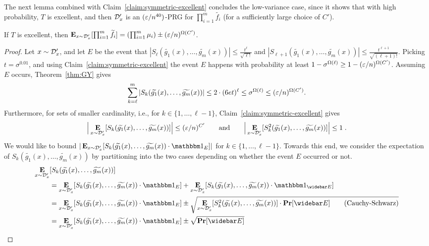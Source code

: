 The next lemma combined with Claim~\ref{claim:symmetric-excellent} concludes the low-variance case, since it shows that with high probability, $T$ is excellent, and then ${\mathcal{D}'_x}$ is an $(\varepsilon/n^{40})$-PRG for $\prod_{i=1}^{m}{\tilde{f_i}}$ (for a sufficiently large choice of $C'$).

\begin{lemma}
If $T$ is excellent, then $\mathop{\bf E\/}_{x\sim {\mathcal{D}'_x}}[	\prod_{i=1}^{m}{\widetilde{f_i}}] = (\prod_{i=1}^{m}\mu_i) \pm (\varepsilon/n)^{\Omega(C')}$.
\end{lemma}
\begin{proof}
Let $x\sim {\mathcal{D}'_x}$, 
and let $E$ be the event that
$|S_{\ell}(\tilde{g_1}(x), \ldots, \tilde{g_m}(x))| \le \frac{t^\ell}{\sqrt{\ell!}}$ 
and 
$|S_{\ell+1}(\tilde{g_1}(x), \ldots, \tilde{g_m}(x))| \le \frac{t^{\ell+1}}{\sqrt{(\ell+1)!}}$.
Picking $t = \sigma^{0.01}$, and using Claim~\ref{claim:symmetric-excellent} the event $E$ happens with probability at least $1-\sigma^{\Omega(\ell)} \ge 1-(\varepsilon/n)^{\Omega(C')}$.
Assuming $E$ occurs, 
 Theorem~\ref{thm:GY} gives
$$\sum_{k=\ell}^{m} |S_{k}(\widetilde{g_1}(x), \ldots, \widetilde{g_m}(x))| \le 2\cdot (6et)^{\ell} \le \sigma^{\Omega(\ell)} \le (\varepsilon/n)^{\Omega(C')}.$$
Furthermore, for sets of smaller cardinality, i.e., for $k \in \{1,\ldots, \ell-1\}$, Claim~\ref{claim:symmetric-excellent} gives
$$\Big|\mathop{\bf E\/}_{x\sim {\mathcal{D}'_x}}[S_{k}(\widetilde{g_1}(x), \ldots, \widetilde{g_m}(x))]\Big| \le (\varepsilon/n)^{C'} \qquad\text{and}\qquad\Big|\mathop{\bf E\/}_{x\sim {\mathcal{D}'_x}}[S_{k}^2(\widetilde{g_1}(x), \ldots, \widetilde{g_m}(x))]\Big| \le 1\;.$$
We would like to bound $|\E_{x\sim \Dtagx}[S_{k}(\tilde{g_1}(x), \ldots, \tilde{g_m}(x)) \cdot \one_{E}]|$ for $k\in \{1,\ldots, \ell-1\}$. Towards this end,
we consider the expectation of $S_{k}(\tilde{g_1}(x), \ldots, \tilde{g_m}(x))$ by partitioning into the two cases depending on whether the event $E$ occurred or not.
\begin{align*} \E_{x\sim \Dtagx}&[S_{k}(\tilde{g_1}(x), \ldots, \tilde{g_m}(x))] \\&= \E_{x\sim \Dtagx}[S_{k}(\tilde{g_1}(x), \ldots, \tilde{g_m}(x)) \cdot \one_{E}] + \E_{x\sim \Dtagx}[S_{k}(\tilde{g_1}(x), \ldots, \tilde{g_m}(x)) \cdot \one_{\bar{E}}]\\
&= \E_{x\sim \Dtagx}[S_{k}(\tilde{g_1}(x), \ldots, \tilde{g_m}(x)) \cdot \one_{E}] \pm \sqrt{\E_{x\sim \Dtagx}[S_{k}^2(\tilde{g_1}(x), \ldots, \tilde{g_m}(x))] \cdot \Pr[\bar{E}]	\tag{Cauchy-Schwarz}}\\
&= \E_{x\sim \Dtagx}[S_{k}(\tilde{g_1}(x), \ldots, \tilde{g_m}(x)) \cdot \one_{E}] \pm \sqrt{\Pr[\bar{E}]}\\

\end{align*}
\end{proof}
